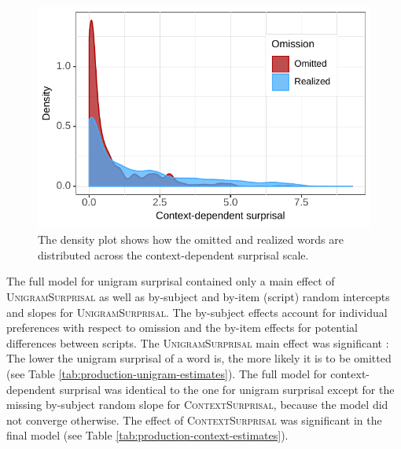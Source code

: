 \begin{figure}
  \includegraphics{figures/scr_production_density_context}
     \caption{The density plot shows how the omitted and realized words are distributed across the context-dependent surprisal scale.\label{fig:production_density-context}}
\end{figure}

The full model for unigram surprisal contained only a main effect of \textsc{UnigramSurprisal} as well as by-subject and by-item (script) random intercepts and slopes for \textsc{UnigramSurprisal}. The by-subject effects account for individual preferences with respect to omission and the by-item effects for potential differences between scripts. The \textsc{UnigramSurprisal} main effect was significant : The lower the unigram surprisal of a word is, the more likely it is to be omitted (see Table \ref{tab:production-unigram-estimates}). The full model for context-dependent surprisal was identical to the one for unigram surprisal except for the missing by-subject random slope for \textsc{ContextSurprisal}, because the model did not converge otherwise. The effect of \textsc{ContextSurprisal} was significant  in the final model (see Table \ref{tab:production-context-estimates}).

